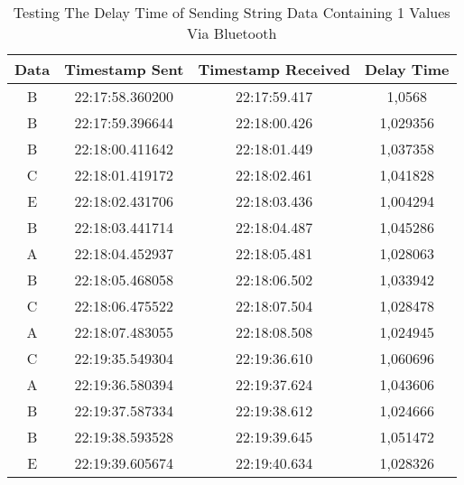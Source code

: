 \begin{table}[!ht]
  \centering
  \caption{Testing The Delay Time of Sending String Data Containing 1 Values Via Bluetooth}
  \label{tbl:delayBluetooth1}
  \begin{tabular}{|ccc|c|}
  \hline
  \multicolumn{1}{|c|}{Data} & \multicolumn{1}{c|}{Timestamp Sent}  & Timestamp Received & Delay Time  \\ \hline
  \multicolumn{1}{|c|}{B}    & \multicolumn{1}{c|}{22:17:58.360200} & 22:17:59.417       & 1,0568      \\ \hline
  \multicolumn{1}{|c|}{B}    & \multicolumn{1}{c|}{22:17:59.396644} & 22:18:00.426       & 1,029356    \\ \hline
  \multicolumn{1}{|c|}{B}    & \multicolumn{1}{c|}{22:18:00.411642} & 22:18:01.449       & 1,037358    \\ \hline
  \multicolumn{1}{|c|}{C}    & \multicolumn{1}{c|}{22:18:01.419172} & 22:18:02.461       & 1,041828    \\ \hline
  \multicolumn{1}{|c|}{E}    & \multicolumn{1}{c|}{22:18:02.431706} & 22:18:03.436       & 1,004294    \\ \hline
  \multicolumn{1}{|c|}{B}    & \multicolumn{1}{c|}{22:18:03.441714} & 22:18:04.487       & 1,045286    \\ \hline
  \multicolumn{1}{|c|}{A}    & \multicolumn{1}{c|}{22:18:04.452937} & 22:18:05.481       & 1,028063    \\ \hline
  \multicolumn{1}{|c|}{B}    & \multicolumn{1}{c|}{22:18:05.468058} & 22:18:06.502       & 1,033942    \\ \hline
  \multicolumn{1}{|c|}{C}    & \multicolumn{1}{c|}{22:18:06.475522} & 22:18:07.504       & 1,028478    \\ \hline
  \multicolumn{1}{|c|}{A}    & \multicolumn{1}{c|}{22:18:07.483055} & 22:18:08.508       & 1,024945    \\ \hline
  \multicolumn{1}{|c|}{C}    & \multicolumn{1}{c|}{22:19:35.549304} & 22:19:36.610       & 1,060696    \\ \hline
  \multicolumn{1}{|c|}{A}    & \multicolumn{1}{c|}{22:19:36.580394} & 22:19:37.624       & 1,043606    \\ \hline
  \multicolumn{1}{|c|}{B}    & \multicolumn{1}{c|}{22:19:37.587334} & 22:19:38.612       & 1,024666    \\ \hline
  \multicolumn{1}{|c|}{B}    & \multicolumn{1}{c|}{22:19:38.593528} & 22:19:39.645       & 1,051472    \\ \hline
  \multicolumn{1}{|c|}{E}    & \multicolumn{1}{c|}{22:19:39.605674} & 22:19:40.634       & 1,028326    \\ \hline

\end{tabular}
\end{table}

